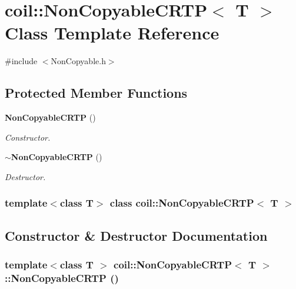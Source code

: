 \section{coil::NonCopyableCRTP$<$ T $>$ Class Template Reference}
\label{classcoil_1_1NonCopyableCRTP}


{\ttfamily \#include $<$NonCopyable.h$>$}

\subsection*{Protected Member Functions}
\begin{DoxyCompactItemize}
\item 
{\bf NonCopyableCRTP} ()
\begin{DoxyCompactList}\small\item\em Constructor. \item\end{DoxyCompactList}\item 
{\bf $\sim$NonCopyableCRTP} ()
\begin{DoxyCompactList}\small\item\em Destructor. \item\end{DoxyCompactList}\end{DoxyCompactItemize}
\subsubsection*{template$<$class T$>$ class coil::NonCopyableCRTP$<$ T $>$}



\subsection{Constructor \& Destructor Documentation}
\subsubsection[{NonCopyableCRTP}]{\setlength{\rightskip}{0pt plus 5cm}template$<$class T $>$ {\bf coil::NonCopyableCRTP}$<$ T $>$::{\bf NonCopyableCRTP} ()\hspace{0.3cm}{\ttfamily  [inline, protected]}}\label{classcoil_1_1NonCopyableCRTP_a3234df905b8bb0c1fdbff8d86c5d3933}


